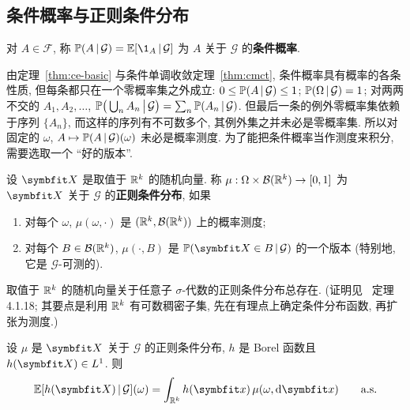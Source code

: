 \subsection{条件概率与正则条件分布}

\begin{definition}[条件概率]\label{def:conditional-probability}
对 $A\in\mathcal{F}$, 称 $\P(A\,|\,\mathcal{G})=\E[\1_A\,|\,\mathcal{G}]$ 为 $A$ 关于 $\mathcal{G}$ 的\textbf{条件概率}.
\end{definition}

由定理~\ref{thm:ce-basic} 与条件单调收敛定理~\ref{thm:cmct}, 条件概率具有概率的各条性质, 但每条都只在一个零概率集之外成立: $0\le\P(A\,|\,\mathcal{G})\le1$; $\P(\Omega\,|\,\mathcal{G})=1$; 对两两不交的 $A_1,A_2,\dots$, $\P\big(\bigcup_nA_n\,\big|\,\mathcal{G}\big)=\sum_n\P(A_n\,|\,\mathcal{G})$. 但最后一条的例外零概率集依赖于序列 $\{A_n\}$, 而这样的序列有不可数多个, 其例外集之并未必是零概率集. 所以对固定的 $\omega$, $A\mapsto\P(A\,|\,\mathcal{G})(\omega)$ 未必是概率测度. 为了能把条件概率当作测度来积分, 需要选取一个 ``好的版本''.

\begin{definition}[正则条件分布]\label{def:regular-conditional}
设 $\rvec{X}$ 是取值于 $\R^k$ 的随机向量. 称 $\mu:\Omega\times\mathcal{B}(\R^k)\to[0,1]$ 为 $\rvec{X}$ 关于 $\mathcal{G}$ 的\textbf{正则条件分布}, 如果
\begin{enumerate}
\item 对每个 $\omega$, $\mu(\omega,\cdot)$ 是 $(\R^k,\mathcal{B}(\R^k))$ 上的概率测度;
\item 对每个 $B\in\mathcal{B}(\R^k)$, $\mu(\cdot,B)$ 是 $\P(\rvec{X}\in B\,|\,\mathcal{G})$ 的一个版本 (特别地, 它是 $\mathcal{G}$-可测的).
\end{enumerate}
\end{definition}

\begin{theorem}[正则条件分布的存在性]\label{thm:regular-existence}
取值于 $\R^k$ 的随机向量关于任意子 $\sigma$-代数的正则条件分布总存在. (证明见~\cite{durrett} 定理 4.1.18; 其要点是利用 $\R^k$ 有可数稠密子集, 先在有理点上确定条件分布函数, 再扩张为测度.)
\end{theorem}

\begin{proposition}\label{prop:regular-integral}
设 $\mu$ 是 $\rvec{X}$ 关于 $\mathcal{G}$ 的正则条件分布, $h$ 是 Borel 函数且 $h(\rvec{X})\in L^1$. 则
\[
\E[h(\rvec{X})\,|\,\mathcal{G}](\omega)=\int_{\R^k}h(\rvec{x})\,\mu(\omega,\dd\rvec{x})\qquad\as
\]
\end{proposition}

